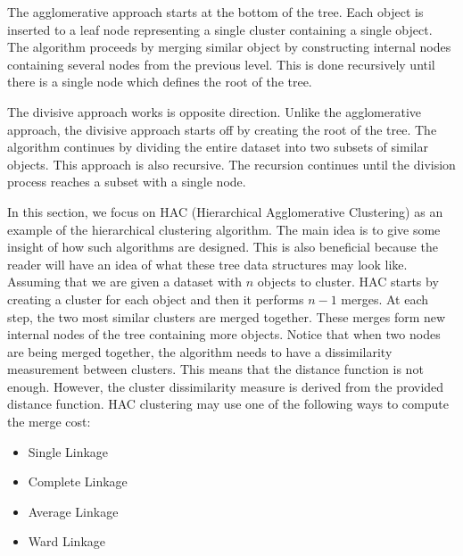 \documentclass[a4paper, 12pt]{article}
\begin{document}
The agglomerative approach starts at the bottom of the tree. Each object is inserted to a leaf node representing a single cluster containing a single object. The algorithm proceeds by merging similar object by constructing internal nodes containing several nodes from the previous level. This is done recursively until there is a single node which defines the root of the tree.

The divisive approach works is opposite direction. Unlike the agglomerative approach, the divisive approach starts off by creating the root of the tree. The algorithm continues by dividing the entire dataset into two subsets of similar objects. This approach is also recursive. The recursion continues until the division process reaches a subset with a single node. 

In this section, we focus on HAC (Hierarchical Agglomerative Clustering) as an example of the hierarchical clustering algorithm. The main idea is to give some insight of how such algorithms are designed. This is also beneficial because the reader will have an idea of what these tree data structures may look like. Assuming that we are given a dataset with $n$ objects to cluster. HAC starts by creating a cluster for each object and then it performs $n - 1$ merges. At each step, the two most similar clusters are merged together. These merges form new internal nodes of the tree containing more objects. Notice that when two nodes are being merged together, the algorithm needs to have a dissimilarity measurement between clusters. This means that the distance function is not enough. However, the cluster dissimilarity measure is derived from the provided distance function. HAC clustering may use one of the following ways to compute the merge cost:
\begin{itemize}
    \item Single Linkage
    \item Complete Linkage
    \item Average Linkage
    \item Ward Linkage
\end{itemize}
\end{document}
